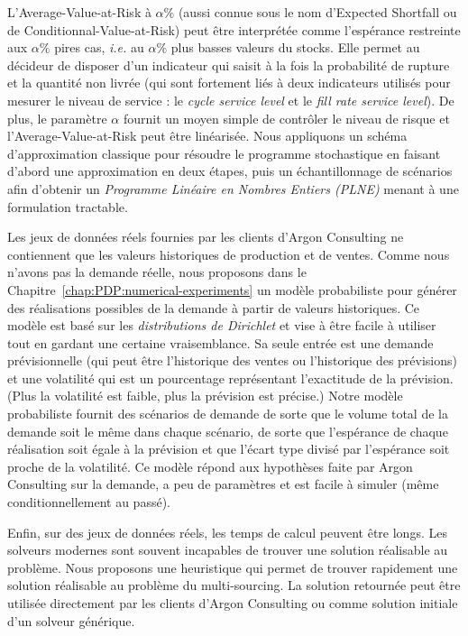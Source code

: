 L'Average-Value-at-Risk à $\alpha\%$ (aussi connue sous le nom d'Expected Shortfall ou de Conditionnal-Value-at-Risk) peut être interprétée comme l'espérance restreinte aux $\alpha\%$ pires cas, \emph{i.e.} au $\alpha\%$ plus basses valeurs du stocks.
Elle permet au décideur de disposer d'un indicateur qui saisit à la fois la probabilité de rupture et la quantité non livrée (qui sont fortement liés à deux indicateurs utilisés pour mesurer le niveau de service : le \emph{cycle service level} et le \emph{fill rate service level}).
De plus, le paramètre $\alpha$ fournit un moyen simple de contrôler le niveau de risque et l'Average-Value-at-Risk peut être linéarisée.
Nous appliquons un schéma d'approximation classique pour résoudre le programme stochastique en faisant d'abord une approximation en deux étapes, puis un échantillonnage de scénarios afin d'obtenir un \emph{Programme Linéaire en Nombres Entiers (PLNE)} menant à une formulation tractable.


\medskip


Les jeux de données réels fournies par les clients d'Argon Consulting ne contiennent que les valeurs historiques de production et de ventes.
Comme nous n'avons pas la demande réelle, nous proposons dans le Chapitre~\ref{chap:PDP:numerical-experiments} un modèle probabiliste pour générer des réalisations possibles de la demande à partir de valeurs historiques.
Ce modèle est basé sur les \emph{distributions de Dirichlet} et vise à être facile à utiliser tout en gardant une certaine vraisemblance.
Sa seule entrée est une demande prévisionnelle (qui peut être l'historique des ventes ou l'historique des prévisions) et une volatilité qui est un pourcentage représentant l'exactitude de la prévision.
(Plus la volatilité est faible, plus la prévision est précise.)
Notre modèle probabiliste fournit des scénarios de demande de sorte que le volume total de la demande soit le même dans chaque scénario, de sorte que l'espérance de chaque réalisation soit égale à la prévision et que l'écart type divisé par l'espérance soit proche de la volatilité.
Ce modèle répond aux hypothèses faite par Argon Consulting sur la demande, a peu de paramètres et est facile à simuler (même conditionnellement au passé).


\medskip


Enfin, sur des jeux de données réels, les temps de calcul peuvent être longs.
Les solveurs modernes sont souvent incapables de trouver une solution réalisable au problème.
Nous proposons une heuristique qui permet de trouver rapidement une solution réalisable au problème du multi-sourcing.
La solution retournée peut être utilisée directement par les clients d'Argon Consulting ou comme solution initiale d'un solveur générique.


